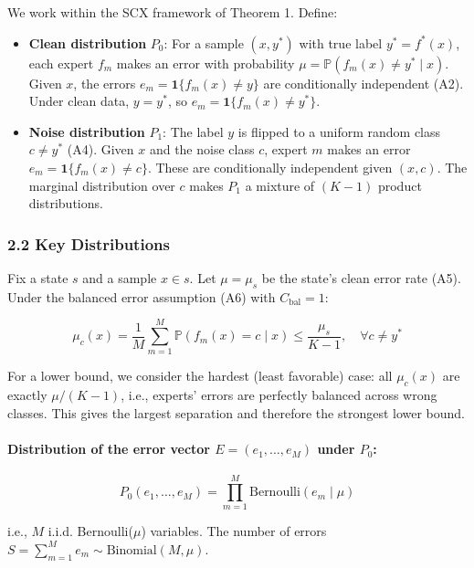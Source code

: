 \documentclass[
  12pt,
]{ctexart}
\begin{document}
We work within the SCX framework of Theorem 1. Define:

\begin{itemize}
\item
  \textbf{Clean distribution} \(P_0\): For a sample \((x, y^*)\) with
  true label \(y^* = f^*(x)\), each expert \(f_m\) makes an error with
  probability \(\mu = \mathbb{P}(f_m(x) \neq y^* \mid x)\). Given \(x\),
  the errors \(e_m = \mathbf{1}\{f_m(x) \neq y\}\) are conditionally
  independent (A2). Under clean data, \(y = y^*\), so
  \(e_m = \mathbf{1}\{f_m(x) \neq y^*\}\).
\item
  \textbf{Noise distribution} \(P_1\): The label \(y\) is flipped to a
  uniform random class \(c \neq y^*\) (A4). Given \(x\) and the noise
  class \(c\), expert \(m\) makes an error
  \(e_m = \mathbf{1}\{f_m(x) \neq c\}\). These are conditionally
  independent given \((x,c)\). The marginal distribution over \(c\)
  makes \(P_1\) a mixture of \((K-1)\) product distributions.
\end{itemize}

\subsubsection{2.2 Key Distributions}\label{key-distributions}

Fix a state \(s\) and a sample \(x \in s\). Let \(\mu = \mu_s\) be the
state's clean error rate (A5). Under the balanced error assumption (A6)
with \(C_{\text{bal}} = 1\):

\[\mu_c(x) = \frac{1}{M} \sum_{m=1}^M \mathbb{P}(f_m(x) = c \mid x) \leq \frac{\mu_s}{K-1}, \quad \forall c \neq y^*\]

For a lower bound, we consider the hardest (least favorable) case: all
\(\mu_c(x)\) are exactly \(\mu/(K-1)\), i.e., experts' errors are
perfectly balanced across wrong classes. This gives the largest
separation and therefore the strongest lower bound.

\paragraph{\texorpdfstring{Distribution of the error vector
\(E = (e_1, \dots, e_M)\) under
\(P_0\):}{Distribution of the error vector E = (e\_1, \textbackslash dots, e\_M) under P\_0:}}\label{distribution-of-the-error-vector-e-e_1-dots-e_m-under-p_0}

\[P_0(e_1, \dots, e_M) = \prod_{m=1}^M \text{Bernoulli}(e_m \mid \mu)\]

i.e., \(M\) i.i.d. Bernoulli(\(\mu\)) variables. The number of errors
\(S = \sum_{m=1}^M e_m \sim \text{Binomial}(M, \mu)\).
\end{document}
